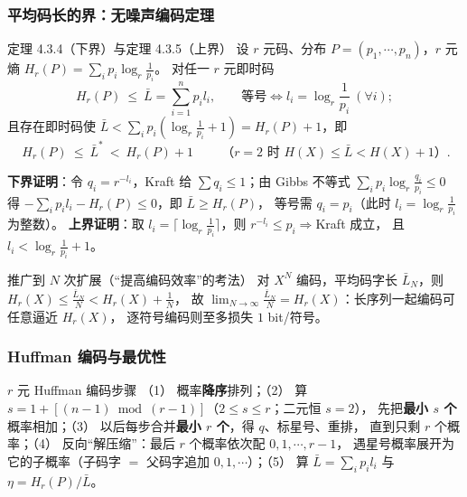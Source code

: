 \subsubsection{平均码长的界：无噪声编码定理}
\begin{thmbox}{定理 4.3.4（下界）与定理 4.3.5（上界）}
设 $r$ 元码、分布 $P=(p_1,\cdots,p_n)$，$r$ 元熵 $H_r(P)=\sum_ip_i\log_r\frac{1}{p_i}$。
对任一 $r$ 元即时码
\begin{equation}
H_r(P)\ \le\ \bar L=\sum_{i=1}^{n}p_il_i ,
\qquad\text{等号}\iff l_i=\log_r\frac{1}{p_i}\ (\forall i);
\tag{4.3.5}
\end{equation}
且存在即时码使
$\bar L<\sum_ip_i\left(\log_r\frac1{p_i}+1\right)=H_r(P)+1$，即
\begin{equation}
\boxed{\ H_r(P)\ \le\ \bar L^{*}\ <\ H_r(P)+1\ }
\qquad\text{（}r=2\text{ 时 }H(X)\le\bar L<H(X)+1\text{）}.
\tag{4.3.6}
\end{equation}
\end{thmbox}
\textbf{下界证明}：令 $q_i=r^{-l_i}$，Kraft 给 $\sum q_i\le1$；由 Gibbs 不等式
$\sum_ip_i\log_r\frac{q_i}{p_i}\le0$ 得 $-\sum_ip_il_i-H_r(P)\le0$，即 $\bar L\ge H_r(P)$，
等号需 $q_i=p_i$（此时 $l_i=\log_r\frac1{p_i}$ 为整数）。
\textbf{上界证明}：取 $l_i=\bigl\lceil\log_r\frac1{p_i}\bigr\rceil$，则 $r^{-l_i}\le p_i\Rightarrow$Kraft 成立，
且 $l_i<\log_r\frac1{p_i}+1$。

\begin{keypoint}{推广到 $N$ 次扩展（“提高编码效率”的考法）}
对 $X^{N}$ 编码，平均码字长 $\bar L_N$，则
$H_r(X)\le\frac{\bar L_N}{N}<H_r(X)+\frac1N$，
故 $\lim_{N\to\infty}\frac{\bar L_N}{N}=H_r(X)$：长序列一起编码可任意逼近 $H_r(X)$，
逐符号编码则至多损失 $1$ bit/符号。
\end{keypoint}

\subsubsection{Huffman 编码与最优性}
\begin{keypoint}{$r$ 元 Huffman 编码步骤}
（1） 概率\textbf{降序}排列；（2） 算 $s=1+[(n-1)\bmod(r-1)]$（$2\le s\le r$；二元恒 $s=2$），
先把\textbf{最小 $s$ 个}概率相加；（3） 以后每步合并\textbf{最小 $r$ 个}，得 $q$、标星号、重排，
直到只剩 $r$ 个概率；（4） 反向“解压缩”：最后 $r$ 个概率依次配 $0,1,\cdots,r-1$，
遇星号概率展开为它的子概率（子码字 $=$ 父码字追加 $0,1,\cdots$）；（5） 算
$\bar L=\sum_ip_il_i$ 与 $\eta=H_r(P)/\bar L$。
\end{keypoint}

